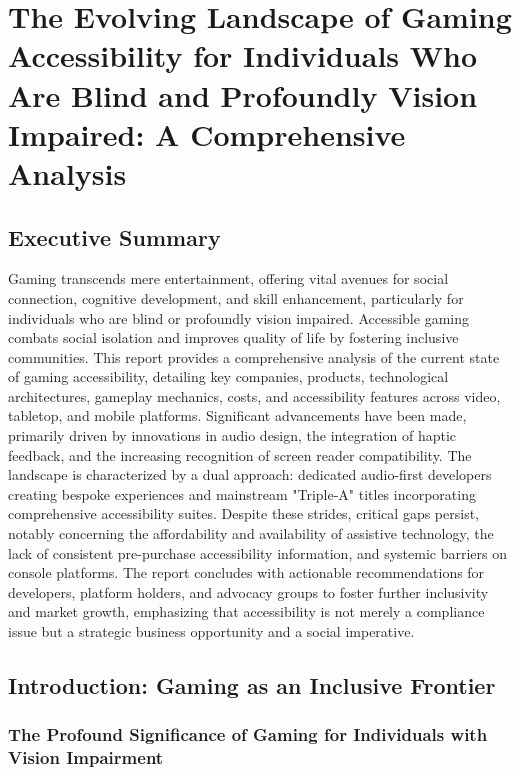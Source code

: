 \chapter{The Evolving Landscape of Gaming Accessibility for Individuals Who Are Blind and Profoundly Vision Impaired: A Comprehensive Analysis}


\section{Executive Summary}

Gaming transcends mere entertainment, offering vital avenues for social connection, cognitive development, and skill enhancement, particularly for individuals who are blind or profoundly vision impaired. Accessible gaming combats social isolation and improves quality of life by fostering inclusive communities\supercite{AbleGamers2025}. This report provides a comprehensive analysis of the current state of gaming accessibility, detailing key companies, products, technological architectures, gameplay mechanics, costs, and accessibility features across video, tabletop, and mobile platforms. Significant advancements have been made, primarily driven by innovations in audio design, the integration of haptic feedback, and the increasing recognition of screen reader compatibility. The landscape is characterized by a dual approach: dedicated audio-first developers creating bespoke experiences and mainstream "Triple-A" titles incorporating comprehensive accessibility suites. Despite these strides, critical gaps persist, notably concerning the affordability and availability of assistive technology, the lack of consistent pre-purchase accessibility information, and systemic barriers on console platforms. The report concludes with actionable recommendations for developers, platform holders, and advocacy groups to foster further inclusivity and market growth, emphasizing that accessibility is not merely a compliance issue but a strategic business opportunity and a social imperative.

\section{Introduction: Gaming as an Inclusive Frontier}


\subsection{The Profound Significance of Gaming for Individuals with Vision Impairment}

